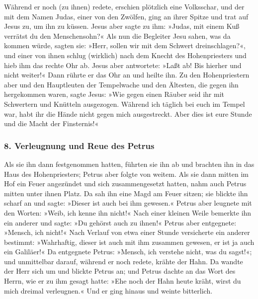  Während er noch (zu ihnen) redete, erschien plötzlich
eine Volksschar, und der mit dem Namen Judas, einer von den Zwölfen,
ging an ihrer Spitze und trat auf Jesus zu, um ihn zu küssen.
 Jesus aber sagte zu ihm: »Judas, mit einem Kuß verrätst
du den Menschensohn?«  Als nun die Begleiter Jesu sahen,
was da kommen würde, sagten sie: »Herr, sollen wir mit dem Schwert
dreinschlagen?«,  und einer von ihnen schlug (wirklich)
nach dem Knecht des Hohenpriesters und hieb ihm das rechte Ohr ab.
 Jesus aber antwortete: »Laßt ab! Bis hierher und nicht
weiter!« Dann rührte er das Ohr an und heilte ihn.  Zu
den Hohenpriestern aber und den Hauptleuten der Tempelwache und den
Ältesten, die gegen ihn hergekommen waren, sagte Jesus: »Wie gegen einen
Räuber seid ihr mit Schwertern und Knütteln ausgezogen. 
Während ich täglich bei euch im Tempel war, habt ihr die Hände nicht
gegen mich ausgestreckt. Aber dies ist eure Stunde und die Macht der
Finsternis!«

\hypertarget{verleugnung-und-reue-des-petrus}{%
\subsubsection{8. Verleugnung und Reue des
Petrus}\label{verleugnung-und-reue-des-petrus}}

 Als sie ihn dann festgenommen hatten, führten sie ihn ab
und brachten ihn in das Haus des Hohenpriesters; Petrus aber folgte von
weitem.  Als sie dann mitten im Hof ein Feuer angezündet
und sich zusammengesetzt hatten, nahm auch Petrus mitten unter ihnen
Platz.  Da sah ihn eine Magd am Feuer sitzen; sie blickte
ihn scharf an und sagte: »Dieser ist auch bei ihm gewesen.«
 Petrus aber leugnete mit den Worten: »Weib, ich kenne
ihn nicht!«  Nach einer kleinen Weile bemerkte ihn ein
anderer und sagte: »Du gehörst auch zu ihnen!« Petrus aber entgegnete:
»Mensch, ich nicht!«  Nach Verlauf von etwa einer Stunde
versicherte ein anderer bestimmt: »Wahrhaftig, dieser ist auch mit ihm
zusammen gewesen, er ist ja auch ein Galiläer!«  Da
entgegnete Petrus: »Mensch, ich verstehe nicht, was du sagst!«; und
unmittelbar darauf, während er noch redete, krähte der Hahn.
 Da wandte der Herr sich um und blickte Petrus an; und
Petrus dachte an das Wort des Herrn, wie er zu ihm gesagt hatte: »Ehe
noch der Hahn heute kräht, wirst du mich dreimal verleugnen.«
 Und er ging hinaus und weinte bitterlich.

